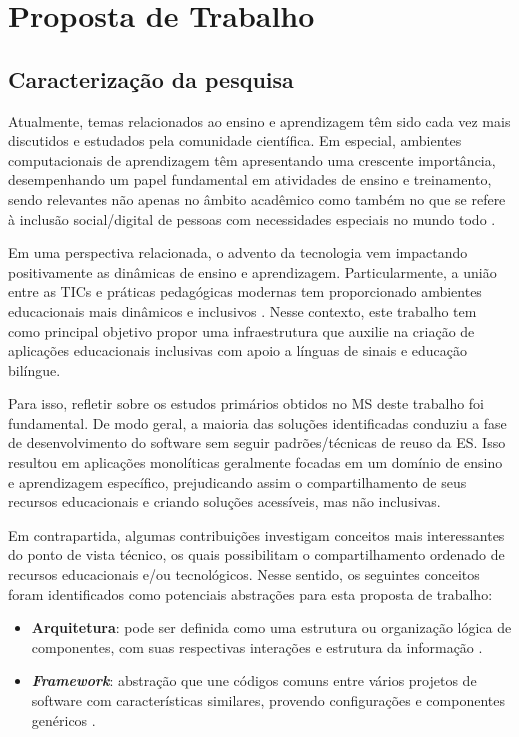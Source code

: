 \chapter{Proposta de Trabalho}
\label{chapter:proposta}

\section{Caracterização da pesquisa}

Atualmente, temas relacionados ao ensino e aprendizagem têm sido cada vez mais discutidos e estudados pela comunidade científica. Em especial, ambientes computacionais de aprendizagem têm apresentando uma crescente importância, desempenhando um papel fundamental em atividades de ensino e treinamento, sendo relevantes não apenas no âmbito acadêmico como também no que se refere à inclusão social/digital de pessoas com necessidades especiais no mundo todo \cite{Svetlana2009,Bersch2017}.

Em uma perspectiva relacionada, o advento da tecnologia vem impactando positivamente as dinâmicas de ensino e aprendizagem. Particularmente, a união entre as TICs e práticas pedagógicas modernas tem proporcionado ambientes educacionais mais dinâmicos e inclusivos \cite{Cilli2017}. Nesse contexto, este trabalho tem como principal objetivo propor uma infraestrutura que auxilie na criação de aplicações educacionais inclusivas com apoio a línguas de sinais e educação bilíngue.

Para isso, refletir sobre os estudos primários obtidos no MS deste trabalho foi fundamental. De modo geral, a maioria das soluções identificadas conduziu a fase de desenvolvimento do software sem seguir padrões/técnicas de reuso da ES. Isso resultou em aplicações monolíticas geralmente focadas em um domínio de ensino e aprendizagem específico, prejudicando assim o compartilhamento de seus recursos educacionais e criando soluções acessíveis, mas não inclusivas.

Em contrapartida, algumas contribuições investigam conceitos mais interessantes do ponto de vista técnico, os quais possibilitam o compartilhamento ordenado de recursos educacionais e/ou tecnológicos. Nesse sentido, os seguintes conceitos foram identificados como potenciais abstrações para esta proposta de trabalho:

\begin{itemize}
    \item \textbf{Arquitetura}: pode ser definida como uma estrutura ou organização lógica de componentes, com suas respectivas interações e estrutura da informação \cite{Pressman2016}. %
    \item \textbf{\textit{Framework}}: abstração que une códigos comuns entre vários projetos de software com características similares, provendo configurações e componentes genéricos \cite{Sommerville2015}.
\end{itemize}

